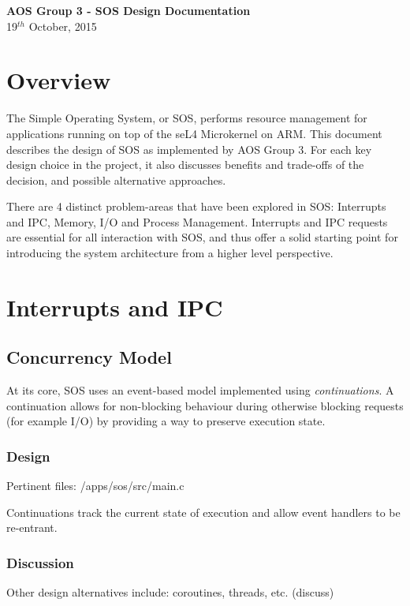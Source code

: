\documentclass[a4paper,12pt]{article}
\begin{document}
\renewcommand{\headheight}{15pt}
\setlength{\parskip}{\baselineskip}%
\setlength{\parindent}{0pt}%
  \begin{center}
    \vspace*{60mm}
    {\Large \bfseries{AOS Group 3 - SOS Design Documentation}}\\[8mm]
    19$^{th}$ October, 2015\\[20mm]
  \end{center}
\newpage
\tableofcontents
\newpage
\section{Overview}
The Simple Operating System, or SOS, performs resource management for
applications running on top of the seL4 Microkernel on ARM.  This document
describes the design of SOS as implemented by AOS Group 3.  For each key
design choice in the project, it also discusses benefits and trade-offs of the
decision, and possible alternative approaches.

There are 4 distinct problem-areas that have been explored in SOS: Interrupts
and IPC, Memory, I/O and Process Management.  Interrupts and IPC requests are
essential for all interaction with SOS, and thus offer a solid starting point
for introducing the system architecture from a higher level perspective.

\section{Interrupts and IPC}
\subsection{Concurrency Model}
At its core, SOS uses an event-based model implemented using
\emph{continuations}.  A continuation allows for non-blocking behaviour during
otherwise blocking requests (for example I/O) by providing a way to preserve
execution state.

\subsubsection{Design}
Pertinent files: /apps/sos/src/main.c

Continuations track the current state of execution and allow event handlers to
be re-entrant.

\subsubsection{Discussion}
Other design alternatives include: coroutines, threads, etc. (discuss)
\end{document}
